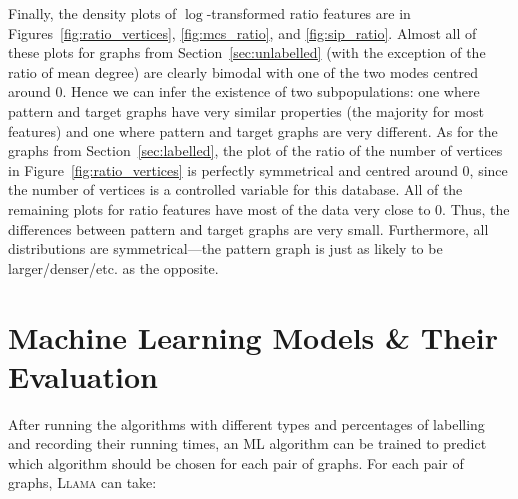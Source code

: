\documentclass{l4proj}
\theoremstyle{definition}
\theoremstyle{remark}
\begin{document}
Finally, the density plots of $\log$-transformed ratio features are in
Figures~\ref{fig:ratio_vertices}, \ref{fig:mcs_ratio}, and \ref{fig:sip_ratio}.
Almost all of these plots for graphs from Section~\ref{sec:unlabelled} (with the
exception of the ratio of mean degree) are clearly bimodal with one of the two
modes centred around 0. Hence we can infer the existence of two subpopulations:
one where pattern and target graphs have very similar properties (the majority
for most features) and one where pattern and target graphs are very different.
As for the graphs from Section~\ref{sec:labelled}, the plot of the ratio of the
number of vertices in Figure~\ref{fig:ratio_vertices} is perfectly symmetrical
and centred around 0, since the number of vertices is a controlled variable for
this database. All of the remaining plots for ratio features have most of the
data very close to 0. Thus, the differences between pattern and target graphs
are very small. Furthermore, all distributions are symmetrical---the pattern
graph is just as likely to be larger/denser/etc. as the opposite.

\chapter{Machine Learning Models \& Their Evaluation}

After running the algorithms  with different types and percentages of labelling
and recording their running times, an ML algorithm can be trained to predict which
algorithm should be chosen for each pair of graphs. For each pair of graphs,
\textsc{Llama} \cite{llama} can take:
\end{document}
